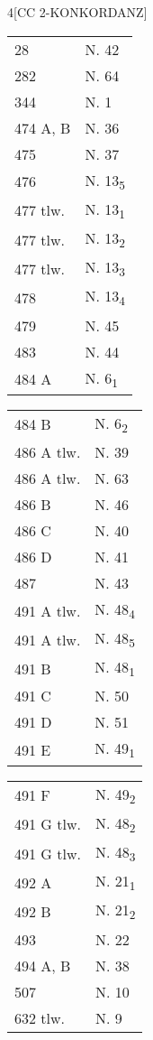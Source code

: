 \begin{multicols}{4}[\centering\footnotesize{\uppercase{Cc 2-Konkordanz}}]
\setlength{\columnseprule}{0.4pt}
\begin{tabular}{ll}
28 & N. 42\\
282 & N. 64\\
344 & N. 1\\
474 A, B & N. 36\\
475 & N. 37\\
476 & N. 13\textsubscript{5}\\
477 tlw. & N. 13\textsubscript{1}\\
477 tlw. & N. 13\textsubscript{2}\\
477 tlw. & N. 13\textsubscript{3}\\
478 & N. 13\textsubscript{4}\\
479 & N. 45\\
483 & N. 44\\
484 A & N. 6\textsubscript{1}
\end{tabular}
\columnbreak
\begin{tabular}{ll}
484 B & N. 6\textsubscript{2}\\
486 A tlw. & N. 39\\
486 A tlw. & N. 63\\
486 B & N. 46\\
486 C & N. 40\\
486 D & N. 41\\
487 & N. 43\\
491 A tlw. & N. 48\textsubscript{4}\\
491 A tlw. & N. 48\textsubscript{5}\\
491 B & N. 48\textsubscript{1}\\
491 C & N. 50\\
491 D & N. 51\\
491 E & N. 49\textsubscript{1}
\end{tabular}
\columnbreak
\begin{tabular}{ll}
491 F & N. 49\textsubscript{2}\\
491 G tlw. & N. 48\textsubscript{2}\\
491 G tlw. & N. 48\textsubscript{3}\\
492 A & N. 21\textsubscript{1}\\
492 B & N. 21\textsubscript{2}\\
493 & N. 22\\
494 A, B & N. 38\\
507 & N. 10\\
632 tlw. & N. 9\\

\end{tabular}
\end{multicols}
